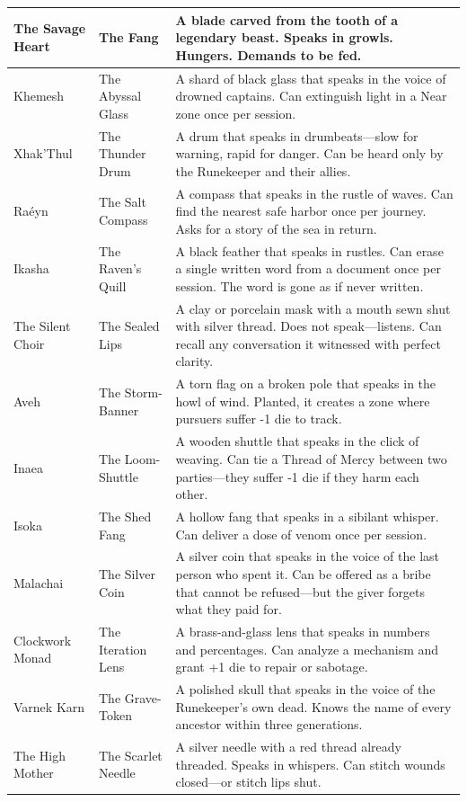 \begin{table}[h]
\begin{tabular}{lll}
The Savage Heart & The Fang & A blade carved from the tooth of a legendary beast. Speaks in growls. Hungers. Demands to be fed. \\
\hline
Khemesh & The Abyssal Glass & A shard of black glass that speaks in the voice of drowned captains. Can extinguish light in a Near zone once per session. \\
Xhak'Thul & The Thunder Drum & A drum that speaks in drumbeats—slow for warning, rapid for danger. Can be heard only by the Runekeeper and their allies. \\
Raéyn & The Salt Compass & A compass that speaks in the rustle of waves. Can find the nearest safe harbor once per journey. Asks for a story of the sea in return. \\
\hline
Ikasha & The Raven's Quill & A black feather that speaks in rustles. Can erase a single written word from a document once per session. The word is gone as if never written. \\
The Silent Choir & The Sealed Lips & A clay or porcelain mask with a mouth sewn shut with silver thread. Does not speak—listens. Can recall any conversation it witnessed with perfect clarity. \\
Aveh & The Storm-Banner & A torn flag on a broken pole that speaks in the howl of wind. Planted, it creates a zone where pursuers suffer -1 die to track. \\
\hline
Inaea & The Loom-Shuttle & A wooden shuttle that speaks in the click of weaving. Can tie a Thread of Mercy between two parties—they suffer -1 die if they harm each other. \\
Isoka & The Shed Fang & A hollow fang that speaks in a sibilant whisper. Can deliver a dose of venom once per session. \\
Malachai & The Silver Coin & A silver coin that speaks in the voice of the last person who spent it. Can be offered as a bribe that cannot be refused—but the giver forgets what they paid for. \\
\hline
Clockwork Monad & The Iteration Lens & A brass-and-glass lens that speaks in numbers and percentages. Can analyze a mechanism and grant +1 die to repair or sabotage. \\
\hline
Varnek Karn & The Grave-Token & A polished skull that speaks in the voice of the Runekeeper's own dead. Knows the name of every ancestor within three generations. \\
The High Mother & The Scarlet Needle & A silver needle with a red thread already threaded. Speaks in whispers. Can stitch wounds closed—or stitch lips shut. \\

\end{tabular}
\end{table}
